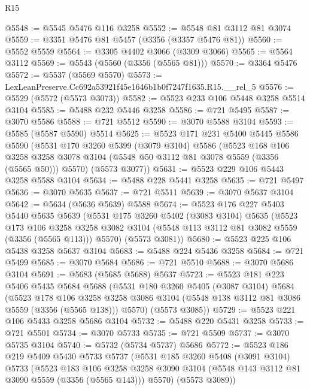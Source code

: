 \begin{lexlean}{R15}
\begin{coremodule}
@5548 := @5545 @5476 @116 @3258
@5552 := @5548 @81 @3112 @81 @3074
@5559 := @3351 @5476 @81 @5457 (@3356 (@3357 @5476 @81))
@5560 := @5552 @5559
@5564 := @3305 @4402 @3066 (@3309 @3066)
@5565 := @5564 @3112
@5569 := @5543 (@5560 (@3356 (@5565 @81)))
@5570 := @3364 @5476
@5572 := @5537 (@5569 @5570)
@5573 := LexLeanPreserve.Cc692a53921f45e1646b1b0f7247f1635.R15.__rel_5
@5576 := @5529 (@5572 (@5573 @3073))
@5582 := @5523 @233 @106 @5448 @3258 @5514 @3104
@5585 := @5488 @232 @5446 @3258
@5586 := @721 @5495
@5587 := @3070 @5586
@5588 := @721 @5512
@5590 := @3070 @5588 @3104
@5593 := @5585 (@5587 @5590) @5514
@5625 := @5523
    @171
    @231
    @5400
    @5445
    @5586
    @5590
    (@5531
      @170
      @3260
      @5399
      (@3079 @3104)
      @5586
      (@5523
        @168
        @106
        @3258
        @3258
        @3078
        @3104
        (@5548 @50 @3112 @81 @3078 @5559 (@3356 (@5565 @50)))
        @5570)
      (@5573 @3077))
@5631 := @5523 @229 @106 @5443 @3258 @5588 @3104
@5634 := @5488 @228 @5441 @3258
@5635 := @721 @5497
@5636 := @3070 @5635
@5637 := @721 @5511
@5639 := @3070 @5637 @3104
@5642 := @5634 (@5636 @5639) @5588
@5674 := @5523
    @176
    @227
    @5403
    @5440
    @5635
    @5639
    (@5531
      @175
      @3260
      @5402
      (@3083 @3104)
      @5635
      (@5523
        @173
        @106
        @3258
        @3258
        @3082
        @3104
        (@5548 @113 @3112 @81 @3082 @5559 (@3356 (@5565 @113)))
        @5570)
      (@5573 @3081))
@5680 := @5523 @225 @106 @5438 @3258 @5637 @3104
@5683 := @5488 @224 @5436 @3258
@5684 := @721 @5499
@5685 := @3070 @5684
@5686 := @721 @5510
@5688 := @3070 @5686 @3104
@5691 := @5683 (@5685 @5688) @5637
@5723 := @5523
    @181
    @223
    @5406
    @5435
    @5684
    @5688
    (@5531
      @180
      @3260
      @5405
      (@3087 @3104)
      @5684
      (@5523
        @178
        @106
        @3258
        @3258
        @3086
        @3104
        (@5548 @138 @3112 @81 @3086 @5559 (@3356 (@5565 @138)))
        @5570)
      (@5573 @3085))
@5729 := @5523 @221 @106 @5433 @3258 @5686 @3104
@5732 := @5488 @220 @5431 @3258
@5733 := @721 @5501
@5734 := @3070 @5733
@5735 := @721 @5509
@5737 := @3070 @5735 @3104
@5740 := @5732 (@5734 @5737) @5686
@5772 := @5523
    @186
    @219
    @5409
    @5430
    @5733
    @5737
    (@5531
      @185
      @3260
      @5408
      (@3091 @3104)
      @5733
      (@5523
        @183
        @106
        @3258
        @3258
        @3090
        @3104
        (@5548 @143 @3112 @81 @3090 @5559 (@3356 (@5565 @143)))
        @5570)
      (@5573 @3089))

\end{coremodule}
\end{lexlean}
